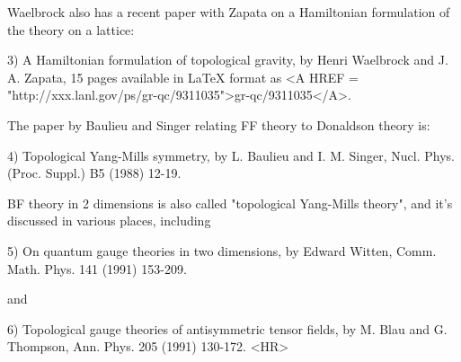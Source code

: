 Waelbrock also has a recent paper with Zapata on a Hamiltonian
formulation of the theory on a lattice:

3) A Hamiltonian formulation of topological gravity, by Henri Waelbrock
and J. A. Zapata, 15 pages available in LaTeX format as <A HREF = "http://xxx.lanl.gov/ps/gr-qc/9311035">gr-qc/9311035</A>.  

The paper by Baulieu and Singer relating FF theory to Donaldson theory
is: 

4) Topological Yang-Mills symmetry, by L. Baulieu and I. M. Singer, 
Nucl. Phys. (Proc. Suppl.) B5 (1988) 12-19.  

BF theory in 2 dimensions is also called "topological Yang-Mills
theory", and it's discussed in various places, including 

5) On quantum gauge theories in two dimensions, by Edward Witten, Comm.
Math. Phys. 141 (1991) 153-209.

and

6) Topological gauge theories of antisymmetric tensor fields,
by M. Blau and G. Thompson, Ann. Phys. 205 (1991) 130-172.
<HR>




